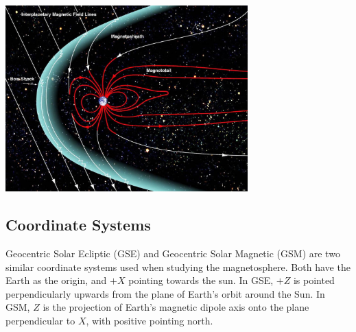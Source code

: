 \documentclass[12pt]{article}
\newenvironment{Figure}
  {\par\medskip\noindent\minipage{\linewidth}}
  {\endminipage\par\medskip}
\begin{document}
\begin{Figure}
    \begin{minipage}[c]{0.57\textwidth}
        \centering
        \includegraphics[width=0.7\textwidth]{NASA-Magnetosphere.jpeg}
    \end{minipage}\hfill
    \begin{minipage}[c]{0.4\textwidth}
        \label{fig:plasmasphere}
    \end{minipage}
\end{Figure}

\subsection{Coordinate Systems}
Geocentric Solar Ecliptic (GSE) and Geocentric Solar Magnetic (GSM) are two similar coordinate systems used when studying the magnetosphere. Both have the Earth as the origin, and $+X$ pointing towards the sun. In GSE, $+Z$ is pointed perpendicularly upwards from the plane of Earth's orbit around the Sun. In GSM, $Z$ is the projection of Earth's magnetic dipole axis onto the plane perpendicular to $X$, with positive pointing north.
\end{document}
